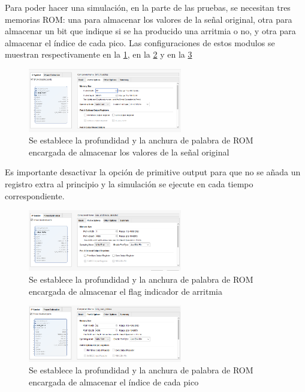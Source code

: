  Para poder hacer una simulación, en la parte de las pruebas, se necesitan tres memorias ROM: una para almacenar los valores de la señal original, otra para almacenar un bit que indique si se ha producido una arritmia o no, y otra para almacenar el índice de cada pico. Las configuraciones de estos modulos se muestran respectivamente en la \cref{fig:inputromconf}, en la \cref{fig:romoutputarritmiasconf} y en la \cref{fig:romoutputpeakindicesconf}



\begin{figure}[h!]
    \centering
    \includegraphics[width=0.6\textwidth]{./Images/img_implementacion_hw/inputromconf.png}
    \caption{Se establece la profundidad y la anchura de palabra de ROM encargada de almacenar los valores de la señal original}
    \label{fig:inputromconf}
\end{figure}
 Es importante desactivar la opción de primitive output para que no se añada un registro extra 
 al principio y la simulación se ejecute en cada tiempo correspondiente. 
\begin{figure}[h!]
    \centering
    \includegraphics[width=0.6\textwidth]{./Images/img_implementacion_hw/romoutputarritmiasconf.png}
    \caption{Se establece la profundidad y la anchura de palabra de ROM encargada de almacenar el flag indicador de arritmia}
    \label{fig:romoutputarritmiasconf}
\end{figure}

\begin{figure}[h!]
    \centering
    \includegraphics[width=0.6\textwidth]{./Images/img_implementacion_hw/romoutputpeakindicesconf.png}
    \caption{Se establece la profundidad y la anchura de palabra de ROM encargada de almacenar el índice de cada pico}
    \label{fig:romoutputpeakindicesconf}
\end{figure}

